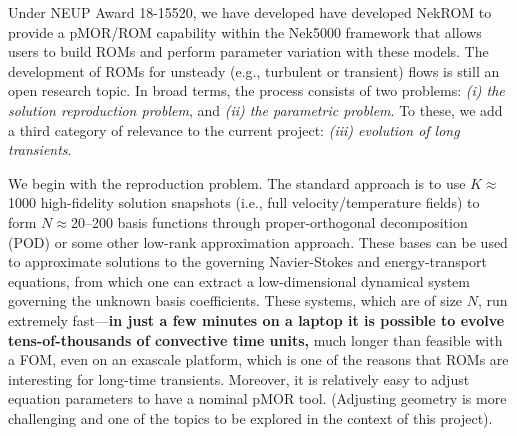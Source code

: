 Under NEUP Award 18-15520, we have developed have developed NekROM to provide a
pMOR/ROM capability within the Nek5000 framework that allows users to build
ROMs and perform parameter variation with these models.  The development of
ROMs for unsteady (e.g., turbulent or transient) flows is still an open
research topic.  In broad terms, the process consists of two problems: {\em (i)
the solution reproduction problem}, and {\em (ii) the parametric problem}.  To
these, we add a third category of relevance to the current project: {\em (iii)
evolution of long transients}.

We begin with the reproduction problem. The standard approach is to use
$K$$\approx$1000 high-fidelity solution snapshots (i.e., full velocity/temperature
fields) to form $N$$\approx$20--200 basis functions through 
proper-orthogonal decomposition (POD) or some other low-rank approximation
approach.  These bases can be used to approximate solutions to the governing
Navier-Stokes and energy-transport equations, from which one can extract a 
low-dimensional dynamical system governing the unknown basis coefficients.  
These systems, which are of size $N$, run extremely fast---{\bf in just a few
minutes on a laptop it is possible to evolve tens-of-thousands of convective
time units,} much longer than feasible with a FOM, even on an exascale platform,
which is one of the reasons that ROMs are interesting for long-time transients.
Moreover, it is relatively easy to adjust equation parameters to have a nominal
pMOR tool.  (Adjusting geometry is more challenging and one of the topics to be
explored in the context of this project).

